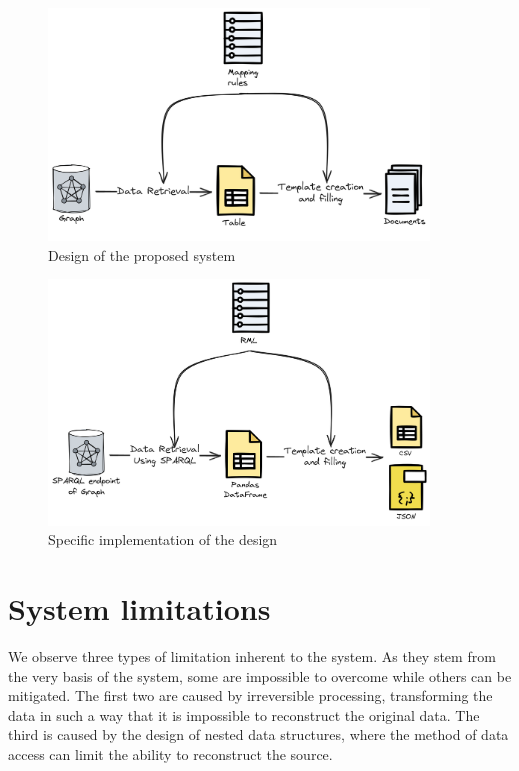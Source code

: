 \begin{figure}
    \centering
    \includegraphics[width=0.9\textwidth]{fig/design.png}
    \caption{Design of the proposed system}
    \label{fig:design}   
\end{figure}

\begin{figure}
    \centering
    \includegraphics[width=0.9\textwidth]{fig/specific_design.png}
    \caption{Specific implementation of the design}
    \label{fig:specific_design}
\end{figure}

\section{System limitations}
\label{section:limitations}

We observe three types of limitation inherent to the system. As they stem from the very basis of the system, some are impossible to overcome while others can be mitigated. The first two are caused by irreversible processing, transforming the data in such a way that it is impossible to reconstruct the original data. The third is caused by the design of nested data structures, where the method of data access can limit the ability to reconstruct the source.

